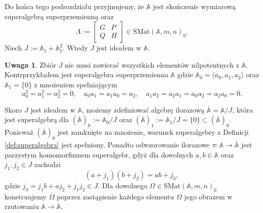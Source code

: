 \documentclass[11pt,a4paper]{report}
\theoremstyle{definition}
\newtheorem{remark}[theorem]{Uwaga}
\begin{document}
Do końca tego podrozdziału przyjmujemy, że $\mathbb{A}$ jest skończenie wymiarową superalgebrą superprzemienną oraz
\begin{equation*}
	\Lambda := \begin{bmatrix}
	G & P \\
	Q & H
	\end{bmatrix} \in \underline{\mathrm{SMat}}(\mathbb{A},m,n)_0.
\end{equation*}
Niech $J := \mathbb{A}_1 + \mathbb{A}_1^2$. Wtedy $J$ jest ideałem w $\mathbb{A}$.
\begin{remark}
	Zbiór $J$ nie musi zawierać wszystkich elementów nilpotentnych z $\mathbb{A}$. Kontrprzykładem jest superalgebra superprzemienna $\mathbb{A}$ gdzie $\mathbb{A}_0 = \langle a_0, a_1, a_2 \rangle$ oraz $\mathbb{A}_1 = \{ 0 \}$ z mnożeniem spełniającym
	\begin{equation*}
		a_0^2=a_1^2=a_2^2=0, \quad a_0 a_1 = a_1 a_0 = a_2, \quad a_1 a_2 = a_2 a_1 = a_0 a_2 = a_2 a_0 = 0.
	\end{equation*}
\end{remark}
Skoro $J$ jest ideałem w $\mathbb{A}$, możemy zdefiniować algebrę ilorazową $\overline{\mathbb{A}} = \mathbb{A}/J$, która jest superalgebrą dla
$(\overline{\mathbb{A}})_0 := \mathbb{A}_0 / J$ oraz $(\overline{\mathbb{A}})_1 := \mathbb{A}_1 / J = \{ 0 \} \subset (\overline{\mathbb{A}})_0.$ Ponieważ $(\overline{\mathbb{A}})_0$ jest zamknięte na mnożenie, warunek superalgebry z Definicji \ref{def:superalgebra}  jest spełniony. Ponadto odwzorowanie ilorazowe $\pi: \mathbb{A} \rightarrow \overline{\mathbb{A}}$ jest parzystym homomorfizmem superalgebr, gdyż dla dowolnych $a,b \in \mathbb{A}$ oraz $j_1, j_2 \in J$ zachodzi
$$ (a+j_1)(b+j_2) = ab + j_3,$$
gdzie $j_3 = j_1 b + a j_2 + j_1 j_2 \in J$.
Dla dowolnego $\Omega \in \underline{\mathrm{SMat}}(\mathbb{A},m,n)_0$ konstruujemy $\overline{\Omega}$ poprzez zastąpienie każdego elementu $\Omega$ jego obrazem w rzutowaniu $\mathbb{A} \rightarrow \overline{\mathbb{A}}$.
 
\end{document}
